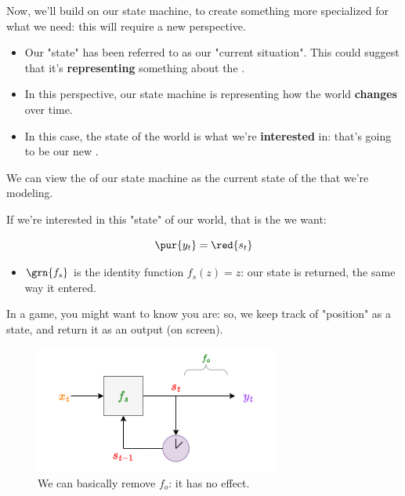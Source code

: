         Now, we'll build on our state machine, to create something more specialized for what we need: this will require a new perspective.
        
        \begin{itemize}
            \item Our "state" has been referred to as our "current situation". This could suggest that it's \textbf{representing} something about the .
            
            \item In this perspective, our state machine is representing how the world \textbf{changes} over time.
            
            \item  In this case, the state of the world is what we're \textbf{interested} in: that's going to be our new .\\
        \end{itemize}

        \begin{concept}
            We can view the  of our state machine as the current state of the  that we're modeling.

            If we're interested in this "state" of our world, that is the  we want:

            \begin{equation*}
                \pur{y_t} = \red{s_t}
            \end{equation*}

            \begin{itemize}
                \item $\grn{f_s}$ is the identity function $f_s(z)=z$: our state is returned, the same way it entered.
            \end{itemize}
            
        \end{concept}

        \miniex In a game, you might want to know  you are: so, we keep track of "position" as a state, and return it as an output (on screen).

        \begin{figure}[H]
            \centering
            \includegraphics[width=80mm,scale=0.5]{images/mdp_images/state_machine_outputstate.png}
            
            \caption*{We can basically remove $f_o$: it has no effect.}
        \end{figure}



